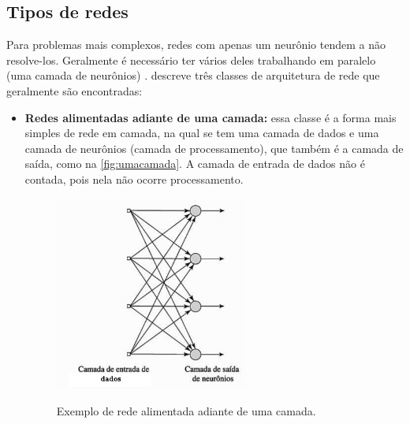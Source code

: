 \subsection{Tipos de redes}
Para problemas mais complexos, redes com apenas um neurônio tendem a não resolve-los. Geralmente é necessário ter vários deles trabalhando em paralelo (uma camada de neurônios) \cite{Demuth:2014:NND:2721661}.  descreve três classes de arquitetura de rede que geralmente são encontradas:
\begin{itemize}
\item \textbf{Redes alimentadas adiante de uma camada:} essa classe é a forma mais simples de rede em camada, na qual se tem uma camada de dados e uma camada de neurônios (camada de processamento), que também é a camada de saída, como na \autoref{fig:umacamada}. A camada de entrada de dados não é contada, pois nela não ocorre processamento.
\begin{figure}[H]
  \centering
  \caption{Exemplo de rede alimentada adiante de uma camada.}
  \includegraphics[width=180pt]{dados/figuras/uma_camada}
  \label{fig:umacamada}
\end{figure}


\end{itemize}
